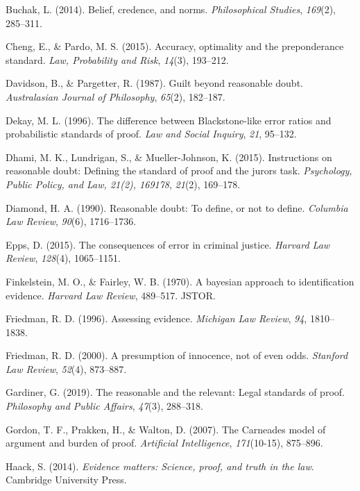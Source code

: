 \documentclass[10pt,dvipsnames]{scrartcl}
\begin{document}
\hypertarget{ref-buchak2014belief}{}
Buchak, L. (2014). Belief, credence, and norms. \emph{Philosophical
Studies}, \emph{169}(2), 285--311.

\hypertarget{ref-cheng2015}{}
Cheng, E., \& Pardo, M. S. (2015). Accuracy, optimality and the
preponderance standard. \emph{Law, Probability and Risk}, \emph{14}(3),
193--212.

\hypertarget{ref-davidsonpargetter1987}{}
Davidson, B., \& Pargetter, R. (1987). Guilt beyond reasonable doubt.
\emph{Australasian Journal of Philosophy}, \emph{65}(2), 182--187.

\hypertarget{ref-Dekay1996}{}
Dekay, M. L. (1996). The difference between Blackstone-like error ratios
and probabilistic standards of proof. \emph{Law and Social Inquiry},
\emph{21}, 95--132.

\hypertarget{ref-dhamiEtAl2015}{}
Dhami, M. K., Lundrigan, S., \& Mueller-Johnson, K. (2015). Instructions
on reasonable doubt: Defining the standard of proof and the jurors task.
\emph{Psychology, Public Policy, and Law, 21(2), 169178}, \emph{21}(2),
169--178.

\hypertarget{ref-diamond90}{}
Diamond, H. A. (1990). Reasonable doubt: To define, or not to define.
\emph{Columbia Law Review}, \emph{90}(6), 1716--1736.

\hypertarget{ref-epps2015}{}
Epps, D. (2015). The consequences of error in criminal justice.
\emph{Harvard Law Review}, \emph{128}(4), 1065--1151.

\hypertarget{ref-finkelstein1970bayesian}{}
Finkelstein, M. O., \& Fairley, W. B. (1970). A bayesian approach to
identification evidence. \emph{Harvard Law Review}, 489--517. JSTOR.

\hypertarget{ref-friedman1996}{}
Friedman, R. D. (1996). Assessing evidence. \emph{Michigan Law Review},
\emph{94}, 1810--1838.

\hypertarget{ref-Friedman2000presumption}{}
Friedman, R. D. (2000). A presumption of innocence, not of even odds.
\emph{Stanford Law Review}, \emph{52}(4), 873--887.

\hypertarget{ref-gardiner2019ppa}{}
Gardiner, G. (2019). The reasonable and the relevant: Legal standards of
proof. \emph{Philosophy and Public Affairs}, \emph{47}(3), 288--318.

\hypertarget{ref-gordon2007}{}
Gordon, T. F., Prakken, H., \& Walton, D. (2007). The Carneades model of
argument and burden of proof. \emph{Artificial Intelligence},
\emph{171}(10-15), 875--896.

\hypertarget{ref-Haack2014-HAAEMS}{}
Haack, S. (2014). \emph{Evidence matters: Science, proof, and truth in
the law}. Cambridge University Press.
\end{document}
